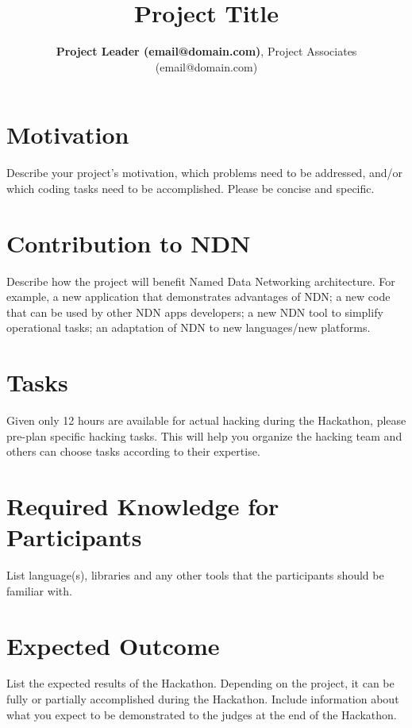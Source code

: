 \documentclass[onecolumn,11pt]{IEEEtran}
\title{Project Title}
\author{\textbf{Project Leader (email@domain.com)}, Project Associates (email@domain.com)}
\begin{document}
\maketitle

\section*{Motivation}

Describe your project's motivation, which problems need to be addressed, and/or which coding tasks need to be accomplished. Please be concise and specific.

\section*{Contribution to NDN}

Describe how the project will benefit Named Data Networking architecture. For example, a new application that demonstrates advantages of NDN; a new code that can be used by other NDN apps developers; a new NDN tool to simplify operational tasks; an adaptation of NDN to new languages/new platforms.

\section*{Tasks}

Given only 12 hours are available for actual hacking during the Hackathon, please pre-plan specific hacking tasks. This will help you organize the hacking team and others can  choose tasks according to their expertise.

\section*{Required Knowledge for Participants}

List language(s), libraries and any other tools that the participants should be familiar with.

\section*{Expected Outcome}

List the expected results of the Hackathon. Depending on the project, it can be fully or partially accomplished during the Hackathon. Include information about what you expect to be demonstrated to the judges at the end of the Hackathon.
\end{document}
